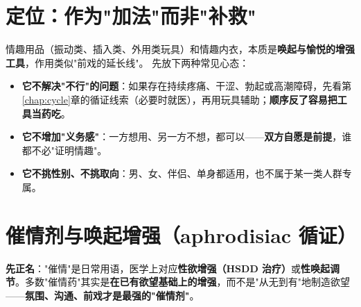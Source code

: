 \documentclass[12pt,UTF8,openany]{ctexbook}
\begin{document}
\section{定位：作为"加法"而非"补救"}
情趣用品（振动类、插入类、外用类玩具）和情趣内衣，本质是\textbf{唤起与愉悦的增强工具}，作用类似"前戏的延长线"。
先放下两种常见心态：
\begin{itemize}[leftmargin=2em,itemsep=0.3em]
  \item \textbf{它不解决"不行"的问题}：如果存在持续疼痛、干涩、勃起或高潮障碍，先看第\ref{chap:cycle}章的循证线索（必要时就医），再用玩具辅助；\textbf{顺序反了容易把工具当药吃}。
  \item \textbf{它不增加"义务感"}：一方想用、另一方不想，都可以——\textbf{双方自愿是前提}，谁都不必"证明情趣"。
  \item \textbf{它不挑性别、不挑取向}：男、女、伴侣、单身都适用，也不属于某一类人群专属。
\end{itemize}

\section{催情剂与唤起增强（aphrodisiac 循证）}

\noindent\textbf{先正名}："催情"是日常用语，医学上对应\textbf{性欲增强（HSDD 治疗）}或\textbf{性唤起调节}。多数"催情药"其实是\textbf{在已有欲望基础上的增强}，而不是"从无到有"地制造欲望——\textbf{氛围、沟通、前戏才是最强的"催情剂"}。
\end{document}
